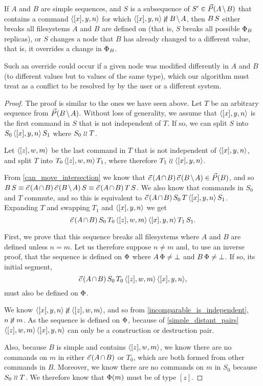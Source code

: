 \begin{myth}
If $A$ and $B$ are simple sequences,
and $S$ is a subsequence of $S'\in\orderset{\ambnp}$ that
contains a command $\langle{[x],y,n}\rangle$ for which $\cxynv\nindep\bmanp$,
then $B\, S$ either breaks all filesystems $A$ and $B$ are defined on
(that is, $S$ breaks all possible $\Phi_B$ replicas),
or $S$ changes a node that $B$ has already changed to a different value,
that is, it overrides a change in $\Phi_B$.
\end{myth}
Such an override could occur if a given node was modified differently in
$A$ and $B$ (to different values but to values of the same type), which 
our algorithm must treat as a conflict to be resolved by
by the user or a different system.
\begin{proof}
The proof is similar to the ones we have seen above.
Let $T$ be an arbitrary sequence from $\orderset{\bmanp}$.
Without loss of generality, we assume that $\langle{[x],y,n}\rangle$ is the first command in $S$
that is not independent of $T$.
If so, we can split $S$ into $S_0\,\langle{[x],y,n}\rangle\, S_1$ where $S_0\mathrel{\wr\wr} T$.

Let $\langle{[z],w,m}\rangle$ be the last command in $T$ that is not independent of $\langle{[x],y,n}\rangle$,
and split $T$ into $T_0\,\langle{[z],w,m}\rangle\, T_1$, where therefore $T_1\mathrel{\wr\wr}\langle{[x],y,n}\rangle$.

From \cref{can_move_intersection} we know that
$\acb\cc\bma \in \orderset{B}$, and so
$B\cc S \equiv \acb\cc\bma\cc S \equiv \acb\cc T\cc S$.
We also know that commands in $S_0$ and $T$ commute, and so this is equivalent to
$\acb\cc S_0\cc T\cc\cxynv\cc S_1$.
Expanding $T$ and swapping $T_1$ and $\langle{[x],y,n}\rangle$ we get
\[ \vec{c}\,({A\nobreak\hspace{-1pt plus 1pt}\nobreak\cap\nobreak\hspace{-1pt plus 1pt}\nobreak B})\, S_0\, T_0 \, \langle{[z],w,m}\rangle \, \langle{[x],y,n}\rangle\, T_1\, S_1. \]

First, we prove that this sequence breaks all filesystems
where $A$ and $B$ are defined unless $n=m$.
Let us therefore suppose $n\neq m$ and, to use an inverse proof,
that the sequence is defined on $\Phi$ 
where $A\,\Phi\neq\bot$ and $B\,\Phi\neq\bot$.
If so, its initial segment,
\[ \vec{c}\,({A\nobreak\hspace{-1pt plus 1pt}\nobreak\cap\nobreak\hspace{-1pt plus 1pt}\nobreak B})\, S_0\, T_0 \, \langle{[z],w,m}\rangle \, \langle{[x],y,n}\rangle, \]
must also be defined on $\Phi$.

We know $\cxynv\nindep\czwmv$, and so from \cref{incomparable_is_independent}, $n\nunrel m$.
As the sequence is defined on $\Phi$,
because of \cref{simple_distant_pairs}
$\langle{[z],w,m}\rangle\,\langle{[x],y,n}\rangle$ can only be a construction or destruction pair.

Also, because $B$ is simple and contains $\langle{[z],w,m}\rangle$,
we know there are no commands on $m$ 
in either $\acb$ or $T_0$, which are both formed from other commands in $B$.
Moreover, we know there are no commands on $m$ in $S_0$ because $S_0\mathrel{\wr\wr} T$.
We therefore know that $\Phi(m)$ must be of type $[z]$.


\end{proof}

